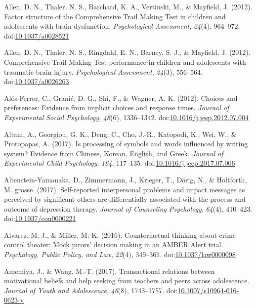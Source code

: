 \documentclass[english,man]{apa6}
\begin{document}
\hypertarget{ref-Allen2012a}{}
Allen, D. N., Thaler, N. S., Barchard, K. A., Vertinski, M., \&
Mayfield, J. (2012). Factor structure of the Comprehensive Trail Making
Test in children and adolescents with brain dysfunction.
\emph{Psychological Assessment}, \emph{24}(4), 964--972.
doi:\href{https://doi.org/10.1037/a0028521}{10.1037/a0028521}

\hypertarget{ref-Allen2012}{}
Allen, D. N., Thaler, N. S., Ringdahl, E. N., Barney, S. J., \&
Mayfield, J. (2012). Comprehensive Trail Making Test performance in
children and adolescents with traumatic brain injury.
\emph{Psychological Assessment}, \emph{24}(3), 556--564.
doi:\href{https://doi.org/10.1037/a0026263}{10.1037/a0026263}

\hypertarget{ref-Alos-Ferrer2012}{}
Alós-Ferrer, C., Granić, D. G., Shi, F., \& Wagner, A. K. (2012).
Choices and preferences: Evidence from implicit choices and response
times. \emph{Journal of Experimental Social Psychology}, \emph{48}(6),
1336--1342.
doi:\href{https://doi.org/10.1016/j.jesp.2012.07.004}{10.1016/j.jesp.2012.07.004}

\hypertarget{ref-Altani2017}{}
Altani, A., Georgiou, G. K., Deng, C., Cho, J.-R., Katopodi, K., Wei,
W., \& Protopapas, A. (2017). Is processing of symbols and words
influenced by writing system? Evidence from Chinese, Korean, English,
and Greek. \emph{Journal of Experimental Child Psychology}, \emph{164},
117--135.
doi:\href{https://doi.org/10.1016/j.jecp.2017.07.006}{10.1016/j.jecp.2017.07.006}

\hypertarget{ref-Altenstein-Yamanaka2017}{}
Altenstein-Yamanaka, D., Zimmermann, J., Krieger, T., Dörig, N., \&
Holtforth, M. grosse. (2017). Self-reported interpersonal problems and
impact messages as perceived by significant others are differentially
associated with the process and outcome of depression therapy.
\emph{Journal of Counseling Psychology}, \emph{64}(4), 410--423.
doi:\href{https://doi.org/10.1037/cou0000221}{10.1037/cou0000221}

\hypertarget{ref-Alvarez2016}{}
Alvarez, M. J., \& Miller, M. K. (2016). Counterfactual thinking about
crime control theater: Mock jurors' decision making in an AMBER Alert
trial. \emph{Psychology, Public Policy, and Law}, \emph{22}(4),
349--361.
doi:\href{https://doi.org/10.1037/law0000098}{10.1037/law0000098}

\hypertarget{ref-Amemiya2017}{}
Amemiya, J., \& Wang, M.-T. (2017). Transactional relations between
motivational beliefs and help seeking from teachers and peers across
adolescence. \emph{Journal of Youth and Adolescence}, \emph{46}(8),
1743--1757.
doi:\href{https://doi.org/10.1007/s10964-016-0623-y}{10.1007/s10964-016-0623-y}
\end{document}

